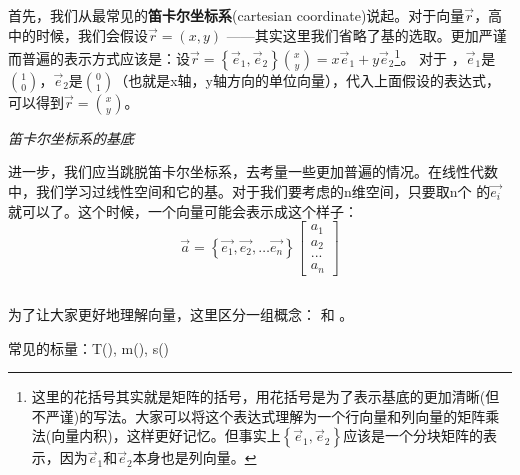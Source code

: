 首先，我们从最常见的\textbf{笛卡尔坐标系}(cartesian coordinate)说起。对于向量$\vec{r}$，高中的时候，我们会假设$\vec{r}=(x,y)$ ——其实这里我们省略了基的选取。更加严谨而普遍的表示方式应该是：设$\displaystyle\vec{r} =\left \{ \vec{e }_{1} ,\vec{e }_{2}  \right \} \binom{x}{y} =x\vec{e }_{1}+y\vec{e }_{2}$\footnote{这里的花括号其实就是矩阵的括号，用花括号是为了表示基底的更加清晰(但不严谨)的写法。大家可以将这个表达式理解为一个行向量和列向量的矩阵乘法(向量内积)，这样更好记忆。但事实上$\left \{ \vec{e }_{1} ,\vec{e }_{2}  \right \}$应该是一个分块矩阵的表示，因为$\vec{e }_{1}$和$\vec{e }_{2}$本身也是列向量。}。
对于 ，$\vec{e }_{1}$是$\displaystyle\binom{1}{0} $，$\displaystyle
    \vec{e }_{2}$是$\displaystyle\binom{0}{1} $（也就是x轴，y轴方向的单位向量），代入上面假设的表达式，可以得到$\displaystyle\vec{r}=\binom{x}{y}  $。
\begin{center}

    \em 笛卡尔坐标系的基底

\end{center}

进一步，我们应当跳脱笛卡尔坐标系，去考量一些更加普遍的情况。在线性代数中，我们学习过线性空间和它的基。对于我们要考虑的n维空间，只要取n个\linebreak{} 的$\vec{e_{i} }$就可以了。这个时候，一个向量可能会表示成这个样子：
\[\vec{a} =\left \{ \vec{e_{1} } ,\vec{e_{2} } ,\ldots\vec{e_{n} }\right \}
    \begin{bmatrix}
        a_{1} \\
        a_{2} \\
        ...   \\
        a_{n}
    \end{bmatrix}\]

\subsection[向量与标量]{}
为了让大家更好地理解向量，这里区分一组概念： 和 。
\begin{Itemize}
    \item {} 
\end{Itemize}
常见的标量：T(), m(), s()
